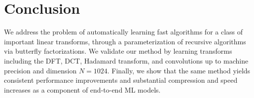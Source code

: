 \section{Conclusion}
\label{sec:conclusion}

We address the problem of automatically learning fast algorithms for a class of important linear transforms, through a parameterization of recursive algorithms via butterfly factorizations. We validate our method by learning transforms including the DFT, DCT, Hadamard transform, and convolutions up to machine precision and dimension $N=1024$. Finally, we show that the same method yields consistent performance improvements and substantial compression and speed increases as a component of end-to-end ML models.


